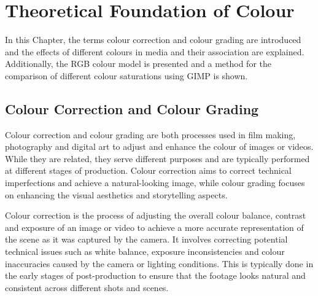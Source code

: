 \documentclass[../MasterThesis.tex]{subfiles}
\begin{document}
	

%
%
%
%
%
%
%
%
\newpage

\section{Theoretical Foundation of Colour} \label{section:theoreticalfoundationofcolour}

In this Chapter, the terms colour correction and colour grading are introduced and the effects of different colours in media and their association are explained. Additionally, the RGB colour model is presented and a method for the comparison of different colour saturations using GIMP is shown.





\subsection{Colour Correction and Colour Grading} 


Colour correction and colour grading are both processes used in film making, photography and digital art to adjust and enhance the colour of images or videos. 
While they are related, they serve different purposes and are typically performed at different stages of production.
%
Colour correction aims to correct technical imperfections and achieve a natural-looking image, while colour grading focuses on enhancing the visual aesthetics and storytelling aspects.~\cite{cc_cg_1, cc_cg_2}


Colour correction is the process of adjusting the overall colour balance, contrast and exposure of an image or video to achieve a more accurate representation of the scene as it was captured by the camera. It involves correcting potential technical issues such as white balance, exposure inconsistencies and colour inaccuracies caused by the camera or lighting conditions.
This is typically done in the early stages of post-production to ensure that the footage looks natural and consistent across different shots and scenes.~\cite{cc1, cc_cg_1, cc_cg_2}
\end{document}
